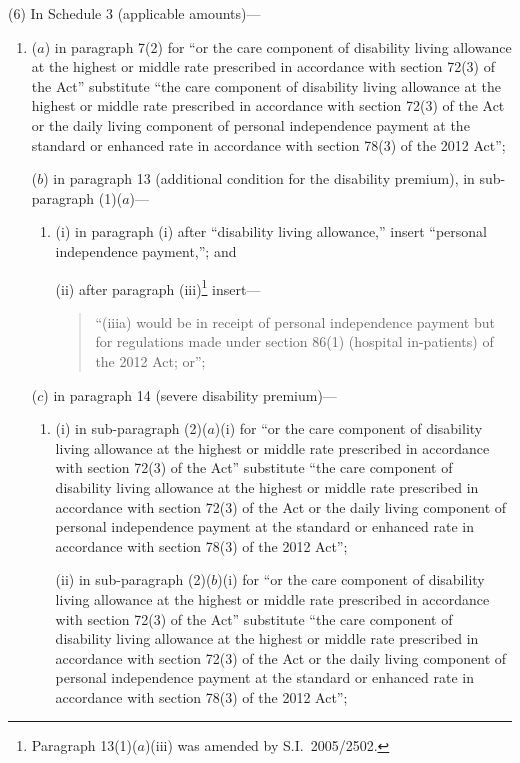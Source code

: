 \documentclass[12pt,a4paper]{article}
\begin{document}
(6) In Schedule 3 (applicable amounts)—
\begin{enumerate}\item[]
($a$) in paragraph 7(2) for “or the care component of disability living allowance at the highest or middle rate prescribed in accordance with section 72(3) of the Act” substitute “the care component of disability living allowance at the highest or middle rate prescribed in accordance with section 72(3) of the Act or the daily living component of personal independence payment at the standard or enhanced rate in accordance with section 78(3) of the 2012 Act”;

($b$) in paragraph 13 (additional condition for the disability premium), in sub-paragraph (1)($a$)—
\begin{enumerate}\item[]
(i) in paragraph (i)  after “disability living allowance,” insert “personal independence payment,”; and

(ii) after paragraph (iii)\footnote{Paragraph 13(1)($a$)(iii)  was amended by S.I.~2005/2502.} insert—
\begin{quotation}
“(iiia) would be in receipt of personal independence payment but for regulations made under section 86(1) (hospital in-patients) of the 2012 Act; or”;
\end{quotation}
\end{enumerate}

($c$) in paragraph 14 (severe disability premium)—
\begin{enumerate}\item[]
(i) in sub-paragraph (2)($a$)(i)  for “or the care component of disability living allowance at the highest or middle rate prescribed in accordance with section 72(3) of the Act” substitute “the care component of disability living allowance at the highest or middle rate prescribed in accordance with section 72(3) of the Act or the daily living component of personal independence payment at the standard or enhanced rate in accordance with section 78(3) of the 2012 Act”;

(ii) in sub-paragraph (2)($b$)(i)  for “or the care component of disability living allowance at the highest or middle rate prescribed in accordance with section 72(3) of the Act” substitute “the care component of disability living allowance at the highest or middle rate prescribed in accordance with section 72(3) of the Act or the daily living component of personal independence payment at the standard or enhanced rate in accordance with section 78(3) of the 2012 Act”;


\end{enumerate}
\end{enumerate}
\end{document}
